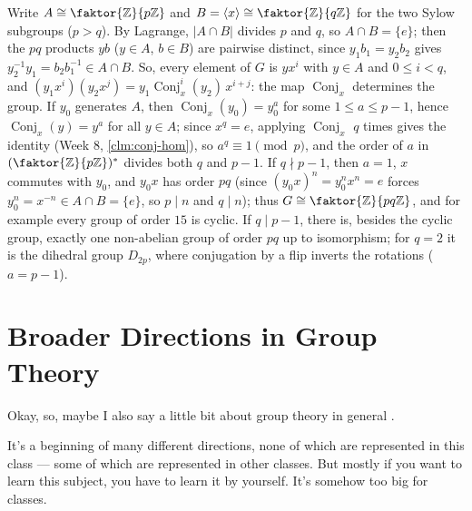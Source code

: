 \begin{aiNote}
Write $A \cong \faktor{\mathbb{Z}}{p\mathbb{Z}}$ and $B = \langle x \rangle \cong \faktor{\mathbb{Z}}{q\mathbb{Z}}$ for the two Sylow subgroups ($p > q$). By Lagrange, $|A \cap B|$ divides $p$ and $q$, so $A \cap B = \{e\}$; then the $pq$ products $y b$ ($y \in A$, $b \in B$) are pairwise distinct, since $y_1 b_1 = y_2 b_2$ gives $y_2^{-1} y_1 = b_2 b_1^{-1} \in A \cap B$. So, every element of $G$ is $y x^i$ with $y \in A$ and $0 \le i < q$, and $(y_1 x^i)(y_2 x^j) = y_1 \operatorname{Conj}_x^i(y_2) \, x^{i + j}$: the map $\operatorname{Conj}_x$ determines the group. If $y_0$ generates $A$, then $\operatorname{Conj}_x(y_0) = y_0^a$ for some $1 \le a \le p - 1$, hence $\operatorname{Conj}_x(y) = y^a$ for all $y \in A$; since $x^q = e$, applying $\operatorname{Conj}_x$ $q$ times gives the identity (Week 8, \cref{clm:conj-hom}), so $a^q \equiv 1 \pmod p$, and the order of $a$ in $(\faktor{\mathbb{Z}}{p\mathbb{Z}})^*$ divides both $q$ and $p - 1$. If $q \nmid p - 1$, then $a = 1$, $x$ commutes with $y_0$, and $y_0 x$ has order $pq$ (since $(y_0 x)^n = y_0^n x^n = e$ forces $y_0^n = x^{-n} \in A \cap B = \{e\}$, so $p \mid n$ and $q \mid n$); thus $G \cong \faktor{\mathbb{Z}}{pq\mathbb{Z}}$, and for example every group of order $15$ is cyclic. If $q \mid p - 1$, there is, besides the cyclic group, exactly one non-abelian group of order $pq$ up to isomorphism; for $q = 2$ it is the dihedral group $D_{2p}$, where conjugation by a flip inverts the rotations ($a = p - 1$).
\end{aiNote}

\begin{hidden}
\end{hidden}

\section{Broader Directions in Group Theory}

\begin{speech}[00:33:07 - 00:33:51]
Okay, so, maybe I also say a little bit about group theory in general .

It's a beginning of many different directions, none of which are represented in this class --- some of which are represented in other classes. But mostly if you want to learn this subject, you have to learn it by yourself. It's somehow too big for classes.
\end{speech}

